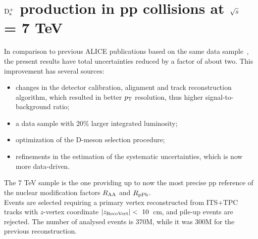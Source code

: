 \chapter{${\rm D_s^+}$ production in pp collisions at $\sqrt{s}$ = 7 TeV}

In comparison to previous ALICE publications based on the same data 
sample~\cite{ALICE:2011aa,Abelev:2012tca,Adam:2016ich}, the present 
results have total uncertainties reduced by a factor of about two. This improvement 
has several sources: 
\begin{itemize}
\item changes in the detector calibration, alignment and track reconstruction 
algorithm, which resulted in better $p_{\rm T}$ resolution, thus higher signal-to-background ratio; 
\item a data sample with 20\% larger integrated luminosity; 
\item optimization of the D-meson selection procedure; 
\item refinements in the estimation of the systematic uncertainties, which is now more data-driven. 
\end{itemize} 
The 7 TeV sample is the one providing up to now the most precise pp reference of
the nuclear modification factors $R_{\rm AA}$ and $R_{\rm pPb}$.\\
Events are selected requiring a primary vertex reconstructed from ITS+TPC tracks with 
$z$-vertex coordinate $|z_{\rm RecoVert}|<~10$~cm, 
and pile-up events are rejected.  
The number of analysed events is 370M, while it was 300M for the previous reconstruction.

